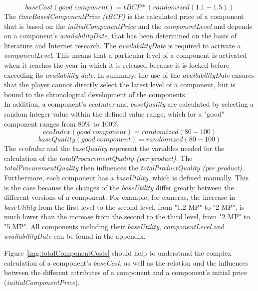 \begin{equation}
    baseCost(good \; component) = tBCP * (randomized(1.1-1.5))
\end{equation}
The \textit{timeBasedComponentPrice (tBCP)} is the calculated price of a component that is based on the \textit{initialComponentPrice} and the \textit{componentLevel} and depends on a component's \textit{availabilityDate}, that has been determined on the basis of literature and Internet research. The \textit{availabilityDate} is required to activate a \textit{componentLevel}. This means that a particular level of a component is activated when it reaches the year in which it is released because it is locked before exceeding its \textit{availability date}. In summary, the use of the \textit{availabilityDate} ensures that the player cannot directly select the latest level of a component, but is bound to the chronological development of the components.\\
In addition, a component's \textit{ecoIndex} and \textit{baseQuality} are calculated by selecting a random integer value within the defined value range, which for a "good" component ranges from 80\% to 100\%.
\begin{equation}
    ecoIndex(good \; component) = randomized(80-100)
\end{equation}
\begin{equation}
    baseQuality(good \; component) = randomized(80-100)
\end{equation}
The \textit{ecoIndex} and the \textit{baseQuality} represent the variables needed for the calculation of the \textit{totalProcurementQuality (per product)}. The \textit{totalProcurementQuality} then influences the \textit{totalProductQuality (per product)}.\\
Furthermore, each component has a \textit{baseUtility}, which is defined manually. This is the case because the changes of the \textit{baseUtility} differ greatly between the different versions of a component. For example, for cameras, the increase in \textit{baseUtility} from the first level to the second level, from "1.2 MP" to "2 MP", is much lower than the increase from the second to the third level, from "2 MP" to "5 MP". All components including their \textit{baseUtility}, \textit{componentLevel} and \textit{availabilityDate} can be found in the appendix. %

Figure \ref{img:totalComponentCosts} should help to understand the complex calculation of a component's \textit{baseCost}, as well as the relation and the influences between the different attributes of a component and a component’s initial price (\textit{initialComponentPrice}).\\

